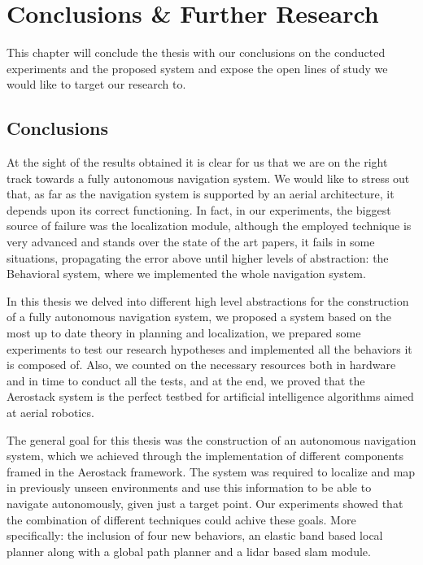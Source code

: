 \chapter{Conclusions \& Further Research} \label{ch_6:chapter}

This chapter will conclude the thesis with our conclusions on the conducted experiments and the proposed system and expose the open lines of study we would like to target our research to. 

\section{Conclusions} \label{ch_6:sect:conclusions}

  At the sight of the results obtained it is clear for us that we are on the right track towards a fully autonomous navigation system. We would like to stress out that, as far as the navigation system is supported by an aerial architecture, it depends upon its correct functioning. In fact, in our experiments, the biggest source of failure was the localization module, although the employed technique is very advanced and stands over the state of the art papers, it fails in some situations, propagating the error above until higher levels of abstraction: the Behavioral system, where we implemented the whole navigation system.

  In this thesis we delved into different high level abstractions for the construction of a fully autonomous navigation system, we proposed a system based on the most up to date theory in planning and localization, we prepared some experiments to test our research hypotheses and implemented all the behaviors it is composed of. Also, we counted on the necessary resources both in hardware and in time to conduct all the tests, and at the end, we proved that the Aerostack system is the perfect testbed for artificial intelligence algorithms aimed at aerial robotics.

  The general goal for this thesis was the construction of an autonomous navigation system, which we achieved through the implementation of different components framed in the Aerostack framework. The system was required to localize and map in previously unseen environments and use this information to be able to navigate autonomously, given just a target point. Our experiments showed that the combination of different techniques could achive these goals. More specifically: the inclusion of four new behaviors, an elastic band based local planner along with a global path planner and a lidar based slam module. 

